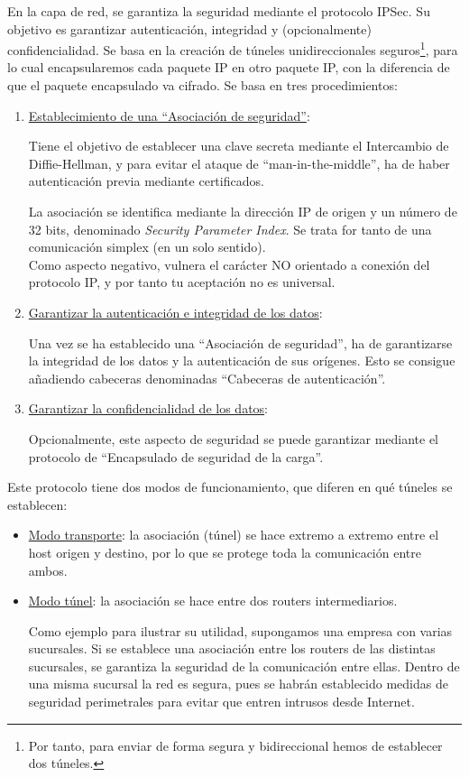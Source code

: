 En la capa de red, se garantiza la seguridad mediante el protocolo \acrfull{IPSec}. Su objetivo es garantizar autenticación, integridad y (opcionalmente) confidencialidad. Se basa en la creación de túneles unidireccionales seguros\footnote{Por tanto, para enviar de forma segura y bidireccional hemos de establecer dos túneles.}, para lo cual encapsularemos cada paquete \acrshort{IP} en otro paquete \acrshort{IP}, con la diferencia de que el paquete encapsulado va cifrado. Se basa en tres procedimientos:
\begin{enumerate}
    \item \ul{Establecimiento de una ``Asociación de seguridad''}:
    
    Tiene el objetivo de establecer una clave secreta mediante el Intercambio de Diffie-Hellman, y para evitar el ataque de ``man-in-the-middle'', ha de haber autenticación previa mediante certificados.

    La asociación se identifica mediante la dirección IP de origen y un número de 32 bits, denominado \emph{Security Parameter Index}. Se trata for tanto de una comunicación simplex (en un solo sentido).\\

    Como aspecto negativo, vulnera el carácter NO orientado a conexión del protocolo \acrshort{IP}, y por tanto tu aceptación no es universal.

    \item \ul{Garantizar la autenticación e integridad de los datos}:
    
    Una vez se ha establecido una ``Asociación de seguridad'', ha de garantizarse la integridad de los datos y la autenticación de sus orígenes. Esto se consigue añadiendo cabeceras denominadas ``Cabeceras de autenticación''.
    \item \ul{Garantizar la confidencialidad de los datos}:
    
    Opcionalmente, este aspecto de seguridad se puede garantizar mediante el protocolo de ``Encapsulado de seguridad de la carga''.
\end{enumerate}

Este protocolo tiene dos modos de funcionamiento, que diferen en qué túneles se establecen:
\begin{itemize}
    \item \ul{Modo transporte}: la asociación (túnel) se hace extremo a extremo entre el host origen y destino, por lo que se protege toda la comunicación entre ambos.
    \item \ul{Modo túnel}: la asociación se hace entre dos routers intermediarios.
    
    Como ejemplo para ilustrar su utilidad, supongamos una empresa con varias sucursales. Si se establece una asociación entre los routers de las distintas sucursales, se garantiza la seguridad de la comunicación entre ellas. Dentro de una misma sucursal la red es segura, pues se habrán establecido medidas de seguridad perimetrales para evitar que entren intrusos desde Internet.
\end{itemize}